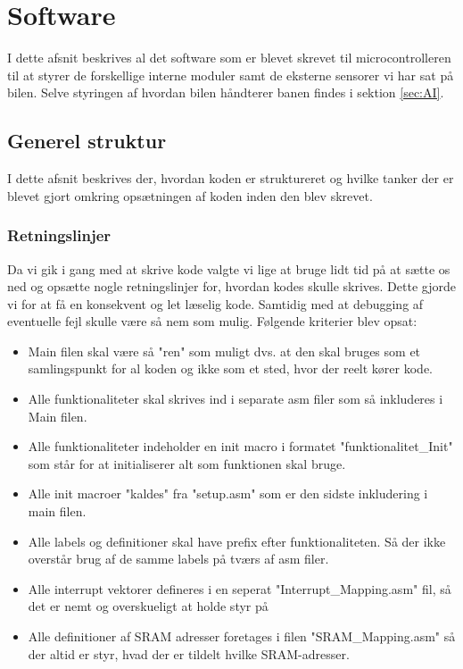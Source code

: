 \section{Software}
I dette afsnit beskrives al det software som er blevet skrevet til microcontrolleren til at styrer de forskellige interne moduler samt de eksterne sensorer vi har sat på bilen. Selve styringen af hvordan bilen håndterer banen findes i sektion \ref{sec:AI}.

\subsection{Generel struktur}
I dette afsnit beskrives der, hvordan koden er struktureret og hvilke tanker der er blevet gjort omkring opsætningen af koden inden den blev skrevet.

\subsubsection{Retningslinjer}
Da vi gik i gang med at skrive kode valgte vi lige at bruge lidt tid på at sætte os ned og opsætte nogle retningslinjer for, hvordan kodes skulle skrives. Dette gjorde vi for at få en konsekvent og let læselig kode. Samtidig med at debugging af eventuelle fejl skulle være så nem som mulig. Følgende kriterier blev opsat:

\begin{itemize}
	\item Main filen skal være så "ren" som muligt dvs. at den skal bruges som et samlingspunkt for al koden og ikke som et 		sted, hvor der reelt kører kode.
	\item Alle funktionaliteter skal skrives ind i separate asm filer som så inkluderes i Main filen.
	\item Alle funktionaliteter indeholder en init macro i formatet "funktionalitet\_Init" som står for at initialiserer 			alt som funktionen skal bruge. 
	\item Alle init macroer "kaldes" fra "setup.asm" som er den sidste inkludering i main filen.
	\item Alle labels og definitioner skal have prefix efter funktionaliteten. Så der ikke overstår brug af de samme labels 		på tværs af asm filer.
	\item Alle interrupt vektorer defineres i en seperat "Interrupt\_Mapping.asm" fil, så det er nemt og overskueligt at 			holde styr på
	\item Alle definitioner af SRAM adresser foretages i filen "SRAM\_Mapping.asm" så der altid er styr, hvad der er 				tildelt hvilke SRAM-adresser.
\end{itemize}

